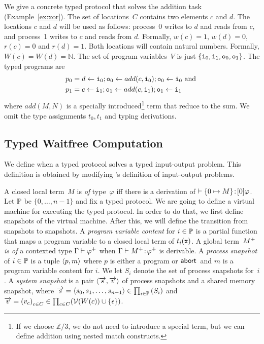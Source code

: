  \begin{example}
  \label{ex:xor-protocol}
  We give a concrete typed protocol that solves the addition task
  (Example~\ref{ex:xor}).
  The set of locations~$C$ contains two elements $c$ and $d$.
  The locations $c$ and $d$ will be used as follows:
  process~0 writes to $d$ and reads from $c$, and process~1
  writes to $c$ and reads from $d$.
  Formally, $w(c) = 1$, $w(d) = 0$, $r(c) = 0$ and $r(d) = 1$.
  Both locations will contain natural numbers.
  Formally, $W(c) = W(d) = \mathbb{N}$.
  The set of program variables~$V$ is just $\{\texttt{i}_0, \texttt{i}_1, \texttt{o}_0, \texttt{o}_1\}$.
  The typed programs are
  \begin{align*}
   p_0 &= d\leftarrow \texttt{i}_0; \texttt{o}_0\leftarrow add(c, \texttt{i}_0); \texttt{o}_0
   \leftarrow \texttt{i}_0 \text{ and }\\
   p_1 &= c\leftarrow \texttt{i}_1; \texttt{o}_1\leftarrow add(c, \texttt{i}_1); \texttt{o}_1
   \leftarrow \texttt{i}_1
  \end{align*}
  where $add(M,N)$ is a specially introduced\footnote{If we choose
  $\mathbb{Z}/3$, we do not need to introduce a special term, but we can
  define addition using nested \textsf{match} constructs.}
  term that reduce to the sum.
  We omit the type assignments $t_0, t_1$ and typing derivations.
 \end{example}

\subsection{Typed Waitfree Computation}

We define when a typed protocol solves a typed
input-output problem.
This definition is obtained by modifying \citet{Saks:1993vq}'s
definition of input-output problems.

A closed local term~$M$ is \textit{of} type~$\varphi$ iff there is
a derivation of $\vdash {\{0\mapsto M\}} \mathord{\colon\kern -2pt}{[0]\varphi}$.
Let $\mathbb{P}$ be $\{0,\ldots, n-1\}$ and fix a typed protocol.
We are going to define a virtual machine for executing the typed
protocol.
In order to do that, we first define snapshots of the virtual machine.
After this, we will define the transition from snapshots to snapshots.
A \textit{program variable content} for
$i\in\mathbb{P}$ is a
partial function that maps a program variable to a closed local term of
$t_i(\texttt{x})$.
A global term~${M}^+$ \textit{is of} a contexted type $\Gamma\vdash{\varphi}^+$ when
$\Gamma\vdash{{M}^+} \mathord{\colon\kern -2pt}{{\varphi}^+}$ is derivable.
A \textit{process snapshot} of $i\in\mathbb{P}$ is a tuple
$\langle{p,m}\rangle$ where $p$ is either a program or $\mathsf{abort\,}$ and $m$ is a
program variable content for $i$.
We let $S_i$ denote the set of process snapshots for~$i$.
A \textit{system snapshot}
is a pair $\langle{\overrightarrow s, \overrightarrow v}\rangle$ of process snapshots and a shared
memory snapshot, where $\overrightarrow s = \langle{s_0,
{s_1,{\ldots,s_{n-1}}}}\rangle \in
\prod_{i\in \mathbb{P}}\left(S_i\right)
$
and
$\overrightarrow v =
\left(v_c\right)_{c\in C} \in \prod_{c\in C}(\mathcal{V}(W(c))\cup\{\epsilon\})
$.

